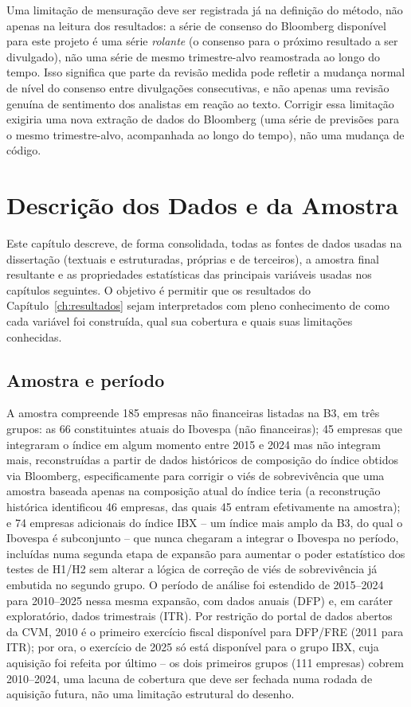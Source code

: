 \documentclass[a4paper,12pt]{report}
\begin{document}
Uma limitação de mensuração deve ser registrada já na definição do método, não apenas na leitura dos resultados: a série de consenso do Bloomberg disponível para este projeto é uma série \textit{rolante} (o consenso para o próximo resultado a ser divulgado), não uma série de mesmo trimestre-alvo reamostrada ao longo do tempo. Isso significa que parte da revisão medida pode refletir a mudança normal de nível do consenso entre divulgações consecutivas, e não apenas uma revisão genuína de sentimento dos analistas em reação ao texto. Corrigir essa limitação exigiria uma nova extração de dados do Bloomberg (uma série de previsões para o mesmo trimestre-alvo, acompanhada ao longo do tempo), não uma mudança de código.

\chapter{Descrição dos Dados e da Amostra}
\label{ch:dados}

Este capítulo descreve, de forma consolidada, todas as fontes de dados usadas na dissertação (textuais e estruturadas, próprias e de terceiros), a amostra final resultante e as propriedades estatísticas das principais variáveis usadas nos capítulos seguintes. O objetivo é permitir que os resultados do Capítulo~\ref{ch:resultados} sejam interpretados com pleno conhecimento de como cada variável foi construída, qual sua cobertura e quais suas limitações conhecidas.

\section{Amostra e período}
\label{sec:amostra}

A amostra compreende 185 empresas não financeiras listadas na B3, em três grupos: as 66 constituintes atuais do Ibovespa (não financeiras); 45 empresas que integraram o índice em algum momento entre 2015 e 2024 mas não integram mais, reconstruídas a partir de dados históricos de composição do índice obtidos via Bloomberg, especificamente para corrigir o viés de sobrevivência que uma amostra baseada apenas na composição atual do índice teria (a reconstrução histórica identificou 46 empresas, das quais 45 entram efetivamente na amostra); e 74 empresas adicionais do índice IBX -- um índice mais amplo da B3, do qual o Ibovespa é subconjunto -- que nunca chegaram a integrar o Ibovespa no período, incluídas numa segunda etapa de expansão para aumentar o poder estatístico dos testes de H1/H2 sem alterar a lógica de correção de viés de sobrevivência já embutida no segundo grupo. O período de análise foi estendido de 2015--2024 para 2010--2025 nessa mesma expansão, com dados anuais (DFP) e, em caráter exploratório, dados trimestrais (ITR). Por restrição do portal de dados abertos da CVM, 2010 é o primeiro exercício fiscal disponível para DFP/FRE (2011 para ITR); por ora, o exercício de 2025 só está disponível para o grupo IBX, cuja aquisição foi refeita por último -- os dois primeiros grupos (111 empresas) cobrem 2010--2024, uma lacuna de cobertura que deve ser fechada numa rodada de aquisição futura, não uma limitação estrutural do desenho.
\end{document}
